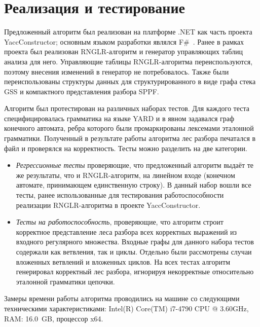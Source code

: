 \section{Реализация и тестирование}
Предложенный алгоритм был реализован на платформе .NET как часть проекта YaccConstructor; основным языком разработки являлся F\#~\cite{FSharp}. Ранее в рамках проекта был реализован RNGLR-алгоритм и генератор управляющих таблиц анализа для него. Управляющие таблицы RNGLR-алгоритма переиспользуются, поэтому внесения изменений в генератор не потребовалось. Также были переиспользованы структуры данных для структурированного в виде графа стека GSS и компактного представления разбора SPPF. 

Алгоритм был протестирован на различных наборах тестов. Для каждого теста специфицировалась грамматика на языке YARD и в явном задавался граф конечного автомата, ребра которого были промаркированы лексемами эталонной грамматики. Полученный в результате работы алгоритма лес разбора печатался в файл и проверялся на корректность. Тесты можно разделить на две категории.
\begin{itemize}
  \item \emph{Регрессионные тесты} проверяющие, что предложенный алгоритм выдаёт те же результаты, что и RNGLR-алгоритм, на линейном входе (конечном автомате, принимающем единственную строку). В данный набор вошли все тесты, ранее использованные для тестирования работоспособности реализации RNGLR-алгоритма в проекте YaccConstructor. 
  \item \emph{Тесты на работоспособность}, проверяющие, что алгоритм строит корректное представление леса разбора всех корректных выражений из входного регулярного множества. Входные графы для данного набора тестов содержали как ветвления, так и циклы. Отдельно были рассмотрены случаи вложенных ветвлений и вложенных циклов. На всех тестах алгоритм генерировал корректный лес разбора, игнорируя некорректные относительно эталонной грамматики цепочки.
\end{itemize}

Замеры времени работы алгоритма проводились на машине со следующими техническими характеристиками: Intel(R) Core(TM) i7-4790 CPU @ 3.60GHz, RAM: 16.0~GB, процессор x64.

